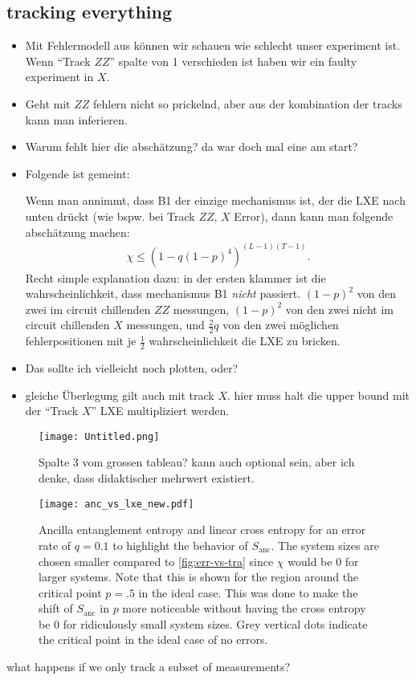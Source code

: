 \subsection{tracking everything}
\begin{itemize}
  \item Mit Fehlermodell aus \cite{tikhanovskayaUniversalityCrossEntropy2023}
    k\"onnen wir schauen wie schlecht unser experiment ist. Wenn
    \enquote{Track $ZZ$} spalte von 1 verschieden ist haben wir ein faulty
    experiment in $X$.
  \item Geht mit $ZZ$ fehlern nicht so prickelnd,%
    aber aus der kombination der tracks kann man inferieren. 
  \item Warum fehlt hier die absch\"atzung? da war doch mal eine am start?
  \item Folgende ist gemeint:

    Wenn man annimmt, dass \textsf{B1} der einzige mechanismus ist, der die LXE
    nach unten dr\"uckt (wie bspw. bei Track $ZZ$, $X$ Error), dann kann man
    folgende absch\"atzung machen:
    \begin{align}
      \chi \leq \left( 1-q\left( 1-p \right)^4  \right)^{(L-1)(T-1)}
    .\end{align}
    Recht simple explanation dazu: in der ersten klammer ist die
    wahrscheinlichkeit, dass mechanismus \textsf{B1} \emph{nicht} passiert.
    $\left( 1-p \right)^2$ von den zwei im circuit chillenden $ZZ$ messungen,
    $\left( 1-p \right)^2$ von den zwei nicht im circuit chillenden $X$
    messungen, und $\frac{2}{2} q$ von den zwei m\"oglichen fehlerpositionen
    mit je $\frac{1}{2}$ wahrscheinlichkeit die LXE zu bricken.

  \item Das sollte ich vielleicht noch plotten, oder?
  \item gleiche \"Uberlegung gilt auch mit track $X$. hier muss halt die upper
    bound mit der \enquote{Track $X$} LXE multipliziert werden.
\end{itemize}
\begin{figure}[h]
  \centering
  \texttt{[image: Untitled.png]}
  \caption{Spalte 3 vom grossen tableau? kann auch optional sein, aber ich
  denke, dass didaktischer mehrwert existiert.}
  \label{fig:lxe-errors-track-all}
\end{figure}
\begin{figure}[H]
  \centering
  \texttt{[image: anc\_vs\_lxe\_new.pdf]}
  \caption{Ancilla entanglement entropy and linear cross entropy for an error
  rate of $q=0.1$ to highlight the behavior of $S_\mathrm{anc}$. The system sizes are chosen smaller compared to
\cref{fig:err-vs-tra} since $\chi$ would be $0$ for larger systems. Note that
this is shown for the region around the critical point $p=.5$ in the ideal
case. This was done to make the shift of $S_\mathrm{anc}$ in $p$ more
noticeable without having the cross entropy be $0$ for ridiculously small
system sizes. Grey vertical dots indicate the critical point in the ideal case
of no errors.}
  \label{fig:large-q-anc-vs-lxe}
\end{figure}
what happens if we only track a subset of measurements?

